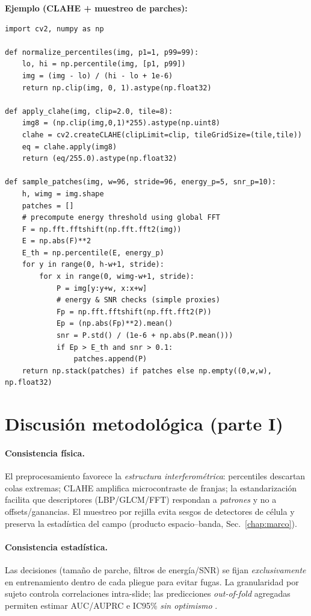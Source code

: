 \noindent\textbf{Ejemplo (CLAHE + muestreo de parches):}
\begin{verbatim}
import cv2, numpy as np

def normalize_percentiles(img, p1=1, p99=99):
    lo, hi = np.percentile(img, [p1, p99])
    img = (img - lo) / (hi - lo + 1e-6)
    return np.clip(img, 0, 1).astype(np.float32)

def apply_clahe(img, clip=2.0, tile=8):
    img8 = (np.clip(img,0,1)*255).astype(np.uint8)
    clahe = cv2.createCLAHE(clipLimit=clip, tileGridSize=(tile,tile))
    eq = clahe.apply(img8)
    return (eq/255.0).astype(np.float32)

def sample_patches(img, w=96, stride=96, energy_p=5, snr_p=10):
    h, wimg = img.shape
    patches = []
    # precompute energy threshold using global FFT
    F = np.fft.fftshift(np.fft.fft2(img))
    E = np.abs(F)**2
    E_th = np.percentile(E, energy_p)
    for y in range(0, h-w+1, stride):
        for x in range(0, wimg-w+1, stride):
            P = img[y:y+w, x:x+w]
            # energy & SNR checks (simple proxies)
            Fp = np.fft.fftshift(np.fft.fft2(P))
            Ep = (np.abs(Fp)**2).mean()
            snr = P.std() / (1e-6 + np.abs(P.mean()))
            if Ep > E_th and snr > 0.1:
                patches.append(P)
    return np.stack(patches) if patches else np.empty((0,w,w), np.float32)
\end{verbatim}

\section{Discusión metodológica (parte I)}
\paragraph{Consistencia física.} El preprocesamiento favorece la \emph{estructura interferométrica}: percentiles descartan colas extremas; CLAHE amplifica microcontraste de franjas; la estandarización facilita que descriptores (LBP/GLCM/FFT) respondan a \emph{patrones} y no a offsets/ganancias. El muestreo por rejilla evita sesgos de detectores de célula y preserva la estadística del campo (producto espacio–banda, Sec.~\ref{chap:marco}).

\paragraph{Consistencia estadística.} Las decisiones (tamaño de parche, filtros de energía/SNR) se fijan \emph{exclusivamente} en entrenamiento dentro de cada pliegue para evitar fugas. La granularidad por sujeto controla correlaciones intra-slide; las predicciones \emph{out-of-fold} agregadas permiten estimar AUC/AUPRC e IC95\% \emph{sin optimismo} \cite{Tsamardinos2022Patterns}.

